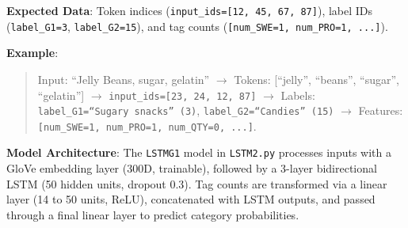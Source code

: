 \documentclass[11pt]{article}
\begin{document}
\textbf{Expected Data}: Token indices (\texttt{input\_ids=[12, 45, 67, 87]}), label IDs (\texttt{label\_G1=3}, \texttt{label\_G2=15}), and tag counts (\texttt{[num\_SWE=1, num\_PRO=1, ...]}).

\textbf{Example}:
\begin{quote}
Input: ``Jelly Beans, sugar, gelatin'' $\to$ Tokens: [``jelly'', ``beans'', ``sugar'', ``gelatin''] $\to$ \texttt{input\_ids=[23, 24, 12, 87]} $\to$ Labels: \texttt{label\_G1=``Sugary snacks'' (3)}, \texttt{label\_G2=``Candies'' (15)} $\to$ Features: \texttt{[num\_SWE=1, num\_PRO=1, num\_QTY=0, ...]}.
\end{quote}

\textbf{Model Architecture}: The \texttt{LSTMG1} model in \texttt{LSTM2.py} processes inputs with a GloVe embedding layer (300D, trainable), followed by a 3-layer bidirectional LSTM (50 hidden units, dropout 0.3). Tag counts are transformed via a linear layer (14 to 50 units, ReLU), concatenated with LSTM outputs, and passed through a final linear layer to predict category probabilities.
\end{document}
